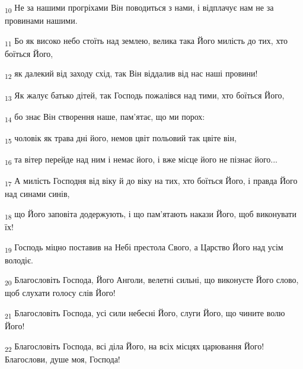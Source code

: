 \begin{tcolorbox}
\textsubscript{10} Не за нашими прогріхами Він поводиться з нами, і відплачує нам не за провинами нашими.
\end{tcolorbox}
\begin{tcolorbox}
\textsubscript{11} Бо як високо небо стоїть над землею, велика така Його милість до тих, хто боїться Його,
\end{tcolorbox}
\begin{tcolorbox}
\textsubscript{12} як далекий від заходу схід, так Він віддалив від нас наші провини!
\end{tcolorbox}
\begin{tcolorbox}
\textsubscript{13} Як жалує батько дітей, так Господь пожалівся над тими, хто боїться Його,
\end{tcolorbox}
\begin{tcolorbox}
\textsubscript{14} бо знає Він створення наше, пам'ятає, що ми порох:
\end{tcolorbox}
\begin{tcolorbox}
\textsubscript{15} чоловік як трава дні його, немов цвіт польовий так цвіте він,
\end{tcolorbox}
\begin{tcolorbox}
\textsubscript{16} та вітер перейде над ним і немає його, і вже місце його не пізнає його...
\end{tcolorbox}
\begin{tcolorbox}
\textsubscript{17} А милість Господня від віку й до віку на тих, хто боїться Його, і правда Його над синами синів,
\end{tcolorbox}
\begin{tcolorbox}
\textsubscript{18} що Його заповіта додержують, і що пам'ятають накази Його, щоб виконувати їх!
\end{tcolorbox}
\begin{tcolorbox}
\textsubscript{19} Господь міцно поставив на Небі престола Свого, а Царство Його над усім володіє.
\end{tcolorbox}
\begin{tcolorbox}
\textsubscript{20} Благословіть Господа, Його Анголи, велетні сильні, що виконуєте Його слово, щоб слухати голосу слів Його!
\end{tcolorbox}
\begin{tcolorbox}
\textsubscript{21} Благословіть Господа, усі сили небесні Його, слуги Його, що чините волю Його!
\end{tcolorbox}
\begin{tcolorbox}
\textsubscript{22} Благословіть Господа, всі діла Його, на всіх місцях царювання Його! Благослови, душе моя, Господа!
\end{tcolorbox}
